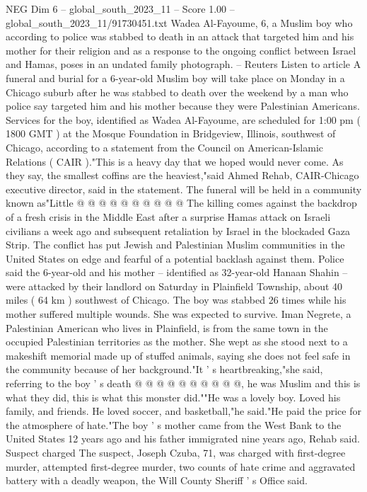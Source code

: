 \begin{textsample}{NEG Dim 6 – global\_south\_2023\_11 – Score 1.00 – global\_south\_2023\_11/91730451.txt}  \label{ex:f6_neg_190}
Wadea Al-Fayoume, 6, a Muslim boy who according to police was stabbed to death in an attack that targeted him and his mother for their religion and as a response to the ongoing conflict between Israel and Hamas, poses in an undated family photograph. -- Reuters Listen to article A funeral and burial for a 6-year-old Muslim boy will take place on Monday in a Chicago suburb after he was stabbed to death over the weekend by a man who police say targeted him and his mother because they were Palestinian Americans.
Services for the boy, identified as Wadea Al-Fayoume, are scheduled for 1:00 pm ( 1800 GMT ) at the Mosque Foundation in Bridgeview, Illinois, southwest of Chicago, according to a statement from the Council on American-Islamic Relations ( CAIR )."This is a heavy day that we hoped would never come.
As they say, the smallest coffins are the heaviest,"said Ahmed Rehab, CAIR-Chicago executive director, said in the statement.
The funeral will be held in a community known as"Little @ @ @ @ @ @ @ @ @ @ The killing comes against the backdrop of a fresh crisis in the Middle East after a surprise Hamas attack on Israeli civilians a week ago and subsequent retaliation by Israel in the blockaded Gaza Strip.
The conflict has put Jewish and Palestinian Muslim communities in the United States on edge and fearful of a potential backlash against them.
Police said the 6-year-old and his mother -- identified as 32-year-old Hanaan Shahin -- were attacked by their landlord on Saturday in Plainfield Township, about 40 miles ( 64 km ) southwest of Chicago.
The boy was stabbed 26 times while his mother suffered multiple wounds.
She was expected to survive.
Iman Negrete, a Palestinian American who lives in Plainfield, is from the same town in the occupied Palestinian territories as the mother.
She wept as she stood next to a makeshift memorial made up of stuffed animals, saying she does not feel safe in the community because of her background."It ' s heartbreaking,"she said, referring to the boy ' s death @ @ @ @ @ @ @ @ @ @, he was Muslim and this is what they did, this is what this monster did.""He was a lovely boy.
Loved his family, and friends.
He loved soccer, and basketball,"he said."He paid the price for the atmosphere of hate."The boy ' s mother came from the West Bank to the United States 12 years ago and his father immigrated nine years ago, Rehab said.
Suspect charged The suspect, Joseph Czuba, 71, was charged with first-degree murder, attempted first-degree murder, two counts of hate crime and aggravated battery with a deadly weapon, the Will County Sheriff ' s Office said.

\end{textsample}
